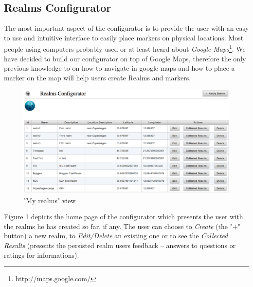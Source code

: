 \subsection{Realms Configurator}
\noindent The most important aspect of the configurator is to provide the user with an easy to use and intuitive interface to easily place markers on physical locations. Most people using computers probably used or at least heard about \emph{Google Maps}\footnote{http://maps.google.com/}. We have decided to build our configurator on top of Google Maps, therefore the only previous knowledge to on how to navigate in google maps and how to place a marker on the map will help users create Realms and markers.
\\

\begin{figure}[H] 
	\centering
	\includegraphics[width=\linewidth]{fig/my_realms.png}
	\caption{"My realms" view}
	\label{fig.my_realms}
\end{figure}

\noindent Figure \ref{fig.my_realms} depicts the home page of the configurator which presents the user with the realms he has created so far, if any. The user can choose to \emph{Create} (the "+" button) a new realm, to \emph{Edit/Delete} an existing one or to see the \emph{Collected Results} (presents the persisted realm users feedback -- answers to questions or ratings for informations).
\\

